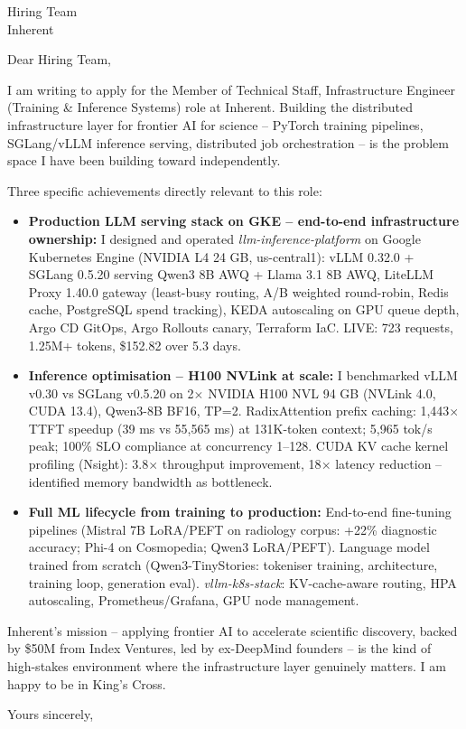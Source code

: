 \documentclass[a4paper]{letter}
\date{\today}
\begin{document}
\begin{letter}{Hiring Team \\ Inherent}

\opening{Dear Hiring Team,}

I am writing to apply for the Member of Technical Staff, Infrastructure Engineer (Training \& Inference Systems) role at Inherent. Building the distributed infrastructure layer for frontier AI for science -- PyTorch training pipelines, SGLang/vLLM inference serving, distributed job orchestration -- is the problem space I have been building toward independently.

Three specific achievements directly relevant to this role:

\begin{itemize}
  \item \textbf{Production LLM serving stack on GKE -- end-to-end infrastructure ownership:} I designed and operated \textit{llm-inference-platform} on Google Kubernetes Engine (NVIDIA L4 24 GB, us-central1): vLLM 0.32.0 + SGLang 0.5.20 serving Qwen3 8B AWQ + Llama 3.1 8B AWQ, LiteLLM Proxy 1.40.0 gateway (least-busy routing, A/B weighted round-robin, Redis cache, PostgreSQL spend tracking), KEDA autoscaling on GPU queue depth, Argo CD GitOps, Argo Rollouts canary, Terraform IaC. LIVE: 723 requests, 1.25M+ tokens, \$152.82 over 5.3 days.

  \item \textbf{Inference optimisation -- H100 NVLink at scale:} I benchmarked vLLM v0.30 vs SGLang v0.5.20 on 2$\times$ NVIDIA H100 NVL 94 GB (NVLink 4.0, CUDA 13.4), Qwen3-8B BF16, TP=2. RadixAttention prefix caching: 1,443$\times$ TTFT speedup (39 ms vs 55,565 ms) at 131K-token context; 5,965 tok/s peak; 100\% SLO compliance at concurrency 1--128. CUDA KV cache kernel profiling (Nsight): 3.8$\times$ throughput improvement, 18$\times$ latency reduction -- identified memory bandwidth as bottleneck.

  \item \textbf{Full ML lifecycle from training to production:} End-to-end fine-tuning pipelines (Mistral 7B LoRA/PEFT on radiology corpus: +22\% diagnostic accuracy; Phi-4 on Cosmopedia; Qwen3 LoRA/PEFT). Language model trained from scratch (Qwen3-TinyStories: tokeniser training, architecture, training loop, generation eval). \textit{vllm-k8s-stack}: KV-cache-aware routing, HPA autoscaling, Prometheus/Grafana, GPU node management.
\end{itemize}

Inherent's mission -- applying frontier AI to accelerate scientific discovery, backed by \$50M from Index Ventures, led by ex-DeepMind founders -- is the kind of high-stakes environment where the infrastructure layer genuinely matters. I am happy to be in King's Cross.

\closing{Yours sincerely,}

\end{letter}
\end{document}
